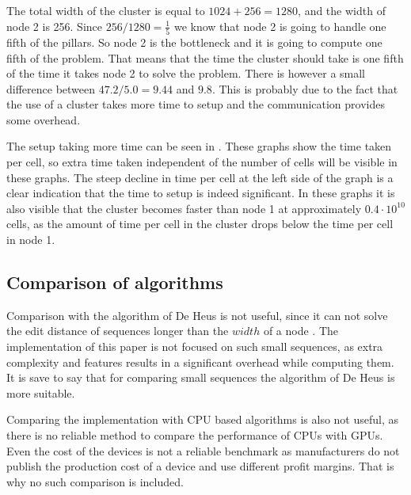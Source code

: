 The total width of the cluster is equal to $1024 + 256 = 1280$, and the width of node 2 is 256.
Since $256 / 1280 = \frac{1}{5}$ we know that node 2 is going to handle one fifth of the pillars.
So node 2 is the bottleneck and it is going to compute one fifth of the problem.
That means that the time the cluster should take is one fifth of the time it takes node 2 to solve the problem.
There is however a small difference between $47.2 / 5.0 = 9.44$ and $9.8$.
This is probably due to the fact that the use of a cluster takes more time to setup and the communication provides some overhead.

The setup taking more time can be seen in .
These graphs show the time taken per cell, so extra time taken independent of the number of cells will be visible in these graphs.
The steep decline in time per cell at the left side of the graph is a clear indication that the time to setup is indeed significant.
In these graphs it is also visible that the cluster becomes faster than node 1 at approximately $0.4 \cdot 10^{10}$ cells, as the amount of time per cell in the cluster drops below the time per cell in node 1.

\subsection{Comparison of algorithms}
Comparison with the algorithm of De Heus is not useful, since it can not solve the edit distance of sequences longer than the $width$ of a node \cite{Heus}.
The implementation of this paper is not focused on such small sequences, as extra complexity and features results in a significant overhead while computing them.
It is save to say that for comparing small sequences the algorithm of De Heus is more suitable.

Comparing the implementation with CPU based algorithms is also not useful, as there is no reliable method to compare the performance of CPUs with GPUs.
Even the cost of the devices is not a reliable benchmark as manufacturers do not publish the production cost of a device and use different profit margins.
That is why no such comparison is included.

